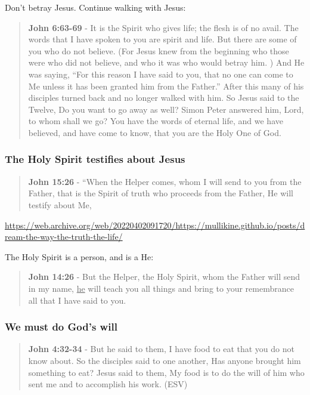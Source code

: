 \documentclass[11pt]{article}
\begin{document}
Don't betray Jesus. Continue walking with Jesus:

\begin{quote}
\textbf{John 6:63-69} - It is the Spirit who gives life; the flesh is of no avail. The words that I have spoken to you are spirit and life. But there are some of you who do not believe. (For Jesus knew from the beginning who those were who did not believe, and who it was who would betray him. ) And He was saying, “For this reason I have said to you, that no one can come to Me unless it has been granted him from the Father.” After this many of his disciples turned back and no longer walked with him. So Jesus said to the Twelve, Do you want to go away as well? Simon Peter answered him, Lord, to whom shall we go? You have the words of eternal life, and we have believed, and have come to know, that you are the Holy One of God.
\end{quote}

\subsubsection{The Holy Spirit testifies about Jesus}
\label{sec:org6c8fe64}
\begin{quote}
\textbf{John 15:26} - “When the Helper comes, whom I will send to you from the Father, that is the Spirit of truth who proceeds from the Father, He will testify about Me,
\end{quote}

\url{https://web.archive.org/web/20220402091720/https://mullikine.github.io/posts/dream-the-way-the-truth-the-life/}

The Holy Spirit is a person, and is a He:

\begin{quote}
\textbf{John 14:26} - But the Helper, the Holy Spirit, whom the Father will send in my name, \uline{he} will teach you all things and bring to your remembrance all that I have said to you.
\end{quote}

\subsubsection{We \textbf{must} do God's will}
\label{sec:org987e12a}

\begin{quote}
\textbf{John 4:32-34} - But he said to them, I have food to eat that you do not know about. So the disciples said to one another, Has anyone brought him something to eat? Jesus said to them, My food is to do the will of him who sent me and to accomplish his work. (ESV)
\end{quote}
\end{document}
